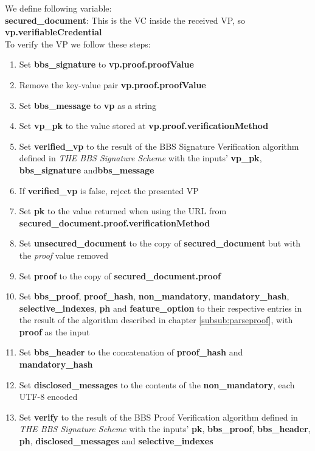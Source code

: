 \documentclass[
	a4paper               %
	,BCOR=0mm            %
	,bibliography=totoc   %
	,listof=totoc         %
	,monolingual
	,twoside=false
]{bfhthesis}              %
\begin{document}
We define following variable:\\
\textbf{secured\_document}: This is the VC inside the received VP, so \textbf{vp.verifiableCredential}\\

To verify the VP we follow these steps:
\begin{enumerate}
	\item Set \textbf{bbs\_signature} to \textbf{vp.proof.proofValue}
	\item Remove the key-value pair \textbf{vp.proof.proofValue}
	\item Set \textbf{bbs\_message} to \textbf{vp} as a string
	\item Set \textbf{vp\_pk} to the value stored at \textbf{vp.proof.verificationMethod}
	\item Set \textbf{verified\_vp} to the result of the BBS Signature Verification algorithm defined in \textit{THE BBS Signature Scheme}\cite{bbs-signature-scheme} with the inputs' \textbf{vp\_pk}, \textbf{bbs\_signature} and\textbf{bbs\_message}
	\item If \textbf{verified\_vp} is false, reject the presented VP
	\item Set \textbf{pk} to the value returned when using the URL from \textbf{secured\_document.proof.verificationMethod}
	\item Set \textbf{unsecured\_document} to the copy of \textbf{secured\_document} but with the \textit{proof} value removed
	\item Set \textbf{proof} to the copy of \textbf{secured\_document.proof}
	\item Set \textbf{bbs\_proof}, \textbf{proof\_hash}, \textbf{non\_mandatory}, \textbf{mandatory\_hash}, \textbf{selective\_indexes}, \textbf{ph} and \textbf{feature\_option} to their respective entries in the result of the algorithm described in chapter \ref{subsub:parseproof}, with \textbf{proof} as the input
	\item Set \textbf{bbs\_header} to the concatenation of \textbf{proof\_hash} and \textbf{mandatory\_hash}
	\item Set \textbf{disclosed\_messages} to the contents of the \textbf{non\_mandatory}, each UTF-8 encoded
	\item Set \textbf{verify} to the result of the BBS Proof Verification algorithm defined in \textit{THE BBS Signature Scheme}\cite{bbs-signature-scheme} with the inputs' \textbf{pk}, \textbf{bbs\_proof}, \textbf{bbs\_header}, \textbf{ph}, \textbf{disclosed\_messages} and \textbf{selective\_indexes}
\end{enumerate}
\end{document}
